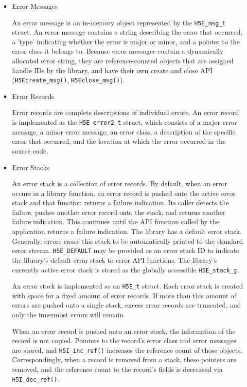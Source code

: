 \begin{itemize}

\item Error Messages

An error message is an in-memory object represented by the \texttt{H5E\_msg\_t} struct. An error message contains a string describing the error that occurred, a 'type' indicating whether the error is major or minor, and a pointer to the error class it belongs to. Because error messages contain a dynamically allocated error string, they are reference-counted objects that are assigned handle IDs by the library, and have their own create and close API (\texttt{H5Ecreate\_msg()}, \texttt{H5Eclose\_msg()}).

\item Error Records

Error records are complete descriptions of individual errors. An error record is implemented as the \texttt{H5E\_error2\_t} struct, which consists of a major error message, a minor error message, an error class, a description of the specific error that occurred, and the location at which the error occurred in the source code. 

\item Error Stacks

An error stack is a collection of error records. By default, when an error occurs in a library function, an error record is pushed onto the active error stack and that function returns a failure indication. Its caller detects the failure, pushes another error record onto the stack, and returns another failure indication. This continues until the API function called by the application returns a failure indication. The library has a default error stack. Generally, errors cause this stack to be automatically printed to the standard error stream. \texttt{H5E\_DEFAULT} may be provided as an error stack ID to indicate the library's default error stack to error API functions. The library's currently active error stack is stored as the globally accessible \texttt{H5E\_stack\_g}. 

An error stack is implemented as an \texttt{H5E\_t} struct. Each error stack is created with space for a fixed amount of error records. If more than this amount of errors are pushed onto a single stack, excess error records are truncated, and only the innermost errors will remain.

When an error record is pushed onto an error stack, the information of the record is not copied. Pointers to the record's error class and error messages are stored, and \texttt{H5I\_inc\_ref()} increases the reference count of those objects. Correspondingly, when a record is removed from a stack, these pointers are removed, and the reference count to the record's fields is decreased via \texttt{H5I\_dec\_ref()}.


\end{itemize}
